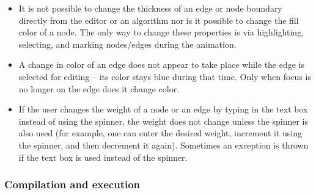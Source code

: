 \begin{itemize}

\item
It is not possible to change the thickness of an edge or node boundary directly
from the editor or an algorithm nor is it possible to change the fill color of a node.
The only way to change these properties is via highlighting, selecting, and
marking nodes/edges during the animation.

\item
A change in color of an edge does not appear to take place while the edge
is selected for editing -- its color stays blue during that time.
Only when focus is no longer on the edge does it change color.

\item
If the user changes the weight of a node or an edge by typing in the text box instead of using the spinner, the weight does not change unless the spinner is
also used (for example, one can enter the desired weight, increment it using the spinner, and then decrement it again).
Sometimes an exception is thrown if the text box is used instead of the spinner. 

\end{itemize}

\subsubsection*{Compilation and execution}

